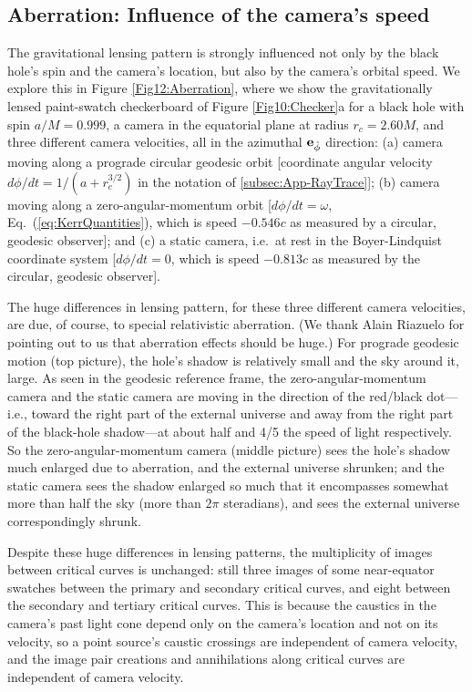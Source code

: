 \documentclass[12pt]{iopart}
\begin{document}
\subsection{Aberration: Influence of the camera's speed}

The gravitational lensing pattern is strongly influenced not only by the black hole's
spin and the camera's location, but also by the camera's orbital speed.  We explore
this in Figure \ref{Fig12:Aberration}, where we show the gravitationally lensed paint-swatch checkerboard of Figure \ref{Fig10:Checker}a for a black hole with spin $a/M=0.999$, a camera in the equatorial plane at radius $r_c=2.60M$, and three different camera velocities, 
all in the azimuthal ${\bf e}_{\hat \phi}$ direction: (a) camera moving along a prograde circular geodesic orbit
[coordinate angular velocity $d\phi/dt =1/(a + r_c^{3/2})$ in the notation of \ref{subsec:App-RayTrace}]; (b) camera moving along a zero-angular-momentum orbit 
[$d\phi/dt=  \omega$, Eq.\ (\ref{eq:KerrQuantities}), which is  speed $-0.546 c$ as measured by a circular, geodesic observer]; and (c) a static camera, i.e.\ at rest
in the Boyer-Lindquist coordinate system [$d\phi/dt = 0$, which is speed $-0.813 c$ as measured by
the circular, geodesic observer].

The huge differences in lensing pattern, for these three different camera velocities, are due, of course, to special relativistic aberration.  (We thank Alain Riazuelo for pointing out to us that  aberration effects should be huge.)  For prograde geodesic motion (top picture), the hole's shadow is relatively small and the sky around it, large.  As seen in the geodesic reference frame, the zero-angular-momentum camera and the static camera are moving in the direction of the red/black dot---i.e., toward the right part of the external universe and away from the right part of the black-hole shadow---at about half and 4/5 the speed of light respectively.  So 
the zero-angular-momentum camera (middle picture) sees the hole's shadow much enlarged due to aberration, and the external universe shrunken; and the static camera sees the shadow enlarged so much that it encompasses somewhat more than half the sky (more than $2\pi$ steradians), and sees the external universe correspondingly shrunk.

Despite these huge differences in lensing patterns, the multiplicity of images between critical curves is unchanged: still three images of some near-equator swatches between the primary and secondary
critical curves, and eight between the secondary and tertiary critical curves.  This is because the caustics in the camera's past light cone depend only on the camera's location and not on its velocity, so a point source's caustic crossings are independent of camera velocity, and the image pair 
creations and annihilations along critical curves are independent of camera velocity.
\end{document}
